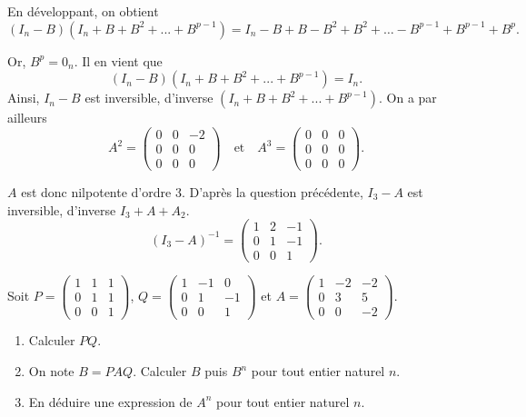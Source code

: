 \documentclass[11pt,fleqn]{book} %
\begin{document}
\begin{solution}En développant, on obtient
\[(I_n-B)(I_n+B+B^2+...+B^{p-1})=I_n-B+B-B^2+B^2+\dots -B^{p-1}+B^{p-1}+B^p.\]

Or, \(B^p=0_n\). Il en vient que 
\[(I_n-B)(I_n+B+B^2+...+B^{p-1}) = I_n.\]
Ainsi, \(I_n-B\) est inversible, d'inverse \((I_n+B+B^2+...+B^{p-1}) \). On a par ailleurs
\[ A^2 = \begin{pmatrix} 0 & 0 & -2 \\ 0 & 0 & 0 \\ 0& 0& 0\end{pmatrix} \quad \text{et}\quad A^3 = \begin{pmatrix} 0&0&0\\0&0&0\\0&0&0\end{pmatrix}.\]

\(A\) est donc nilpotente d'ordre 3. D'après la question précédente, \(I_3-A\) est inversible, d'inverse \(I_3+A+A_2\).
\[(I_3-A)^{-1}=\begin{pmatrix}1&2&-1\\0&1&-1\\0&0&1\end{pmatrix}.\]\end{solution}



\begin{exercise}[topic=mat03]Soit $P=\begin{pmatrix}1 & 1 & 1 \\ 0 & 1& 1 \\ 0 & 0 & 1\end{pmatrix}$, $Q=\begin{pmatrix}1 & -1 & 0 \\ 0&1&-1 \\0 & 0 & 1\end{pmatrix}$ et $A=\begin{pmatrix}1 & -2 & -2 \\0 & 3 & 5 \\ 0 & 0 & -2\end{pmatrix}$.
\begin{enumerate}
\item Calculer $PQ$.
\item On note $B=PAQ$. Calculer $B$ puis $B^n$ pour tout entier naturel $n$.
\item En déduire une expression de $A^n$ pour tout entier naturel $n$.\end{enumerate}\end{exercise}
\end{document}

